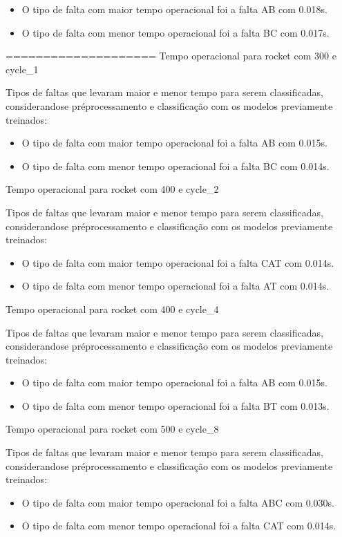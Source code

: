 \begin{itemize}
\item O tipo de falta com maior tempo operacional foi a falta AB com 0.018s.
\item O tipo de falta com menor tempo operacional foi a falta BC com 0.017s.
\end{itemize}
====================
Tempo operacional para rocket com 300 e cycle_1
\item Tipos de faltas que levaram maior e menor tempo para serem classificadas, considerando\hyph se pré\hyph processamento e classificação com os modelos previamente treinados:
\begin{itemize}
\item O tipo de falta com maior tempo operacional foi a falta AB com 0.015s.
\item O tipo de falta com menor tempo operacional foi a falta BC com 0.014s.
\end{itemize}
Tempo operacional para rocket com 400 e cycle_2
\item Tipos de faltas que levaram maior e menor tempo para serem classificadas, considerando\hyph se pré\hyph processamento e classificação com os modelos previamente treinados:
\begin{itemize}
\item O tipo de falta com maior tempo operacional foi a falta CAT com 0.014s.
\item O tipo de falta com menor tempo operacional foi a falta AT com 0.014s.
\end{itemize}
Tempo operacional para rocket com 400 e cycle_4
\item Tipos de faltas que levaram maior e menor tempo para serem classificadas, considerando\hyph se pré\hyph processamento e classificação com os modelos previamente treinados:
\begin{itemize}
\item O tipo de falta com maior tempo operacional foi a falta AB com 0.015s.
\item O tipo de falta com menor tempo operacional foi a falta BT com 0.013s.
\end{itemize}
Tempo operacional para rocket com 500 e cycle_8
\item Tipos de faltas que levaram maior e menor tempo para serem classificadas, considerando\hyph se pré\hyph processamento e classificação com os modelos previamente treinados:
\begin{itemize}
\item O tipo de falta com maior tempo operacional foi a falta ABC com 0.030s.
\item O tipo de falta com menor tempo operacional foi a falta CAT com 0.014s.
\end{itemize}
